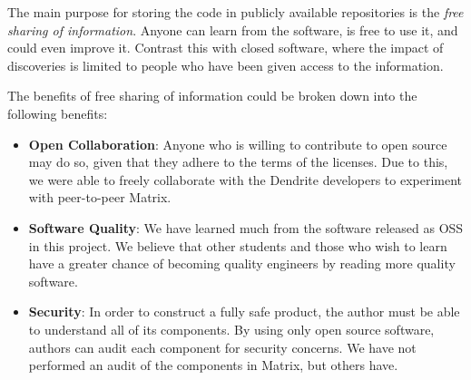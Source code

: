 The main purpose for storing the code in publicly available repositories is the \textit{free sharing of information}.
Anyone can learn from the software, is free to use it, and could even improve it.
Contrast this with closed software, where the impact of discoveries is limited to people who have been given access to the information.

The benefits of free sharing of information could be broken down into the following benefits:
\begin{itemize}
	\item{
	      \textbf{Open Collaboration}:
	      Anyone who is willing to contribute to open source may do so, given that they adhere to the terms of the licenses.
	      Due to this, we were able to freely collaborate with the Dendrite developers to experiment with peer-to-peer Matrix.
	      }
	\item{
	      \textbf{Software Quality}:
	      We have learned much from the software released as \ac{OSS} in this project.
	      We believe that other students and those who wish to learn have a greater chance of becoming quality engineers by reading more quality software.
	      }
	\item{
	      \textbf{Security}:
	      In order to construct a fully safe product, the author must be able to understand all of its components.
	      By using only open source software, authors can audit each component for security concerns.
	      We have not performed an audit of the components in Matrix, but others have\cite{matrix_olm_cryptographic_review}.
	      }
\end{itemize}

